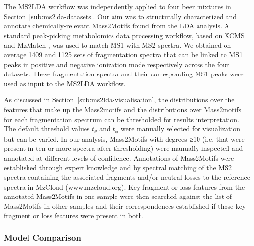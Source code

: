 The MS2LDA workflow was independently applied to four beer mixtures in Section~\ref{sub:ms2lda-datasets}. Our aim was to structurally characterized and annotate chemically-relevant Mass2Motifs found from the LDA analysis. A standard peak-picking metabolomics data processing workflow, based on XCMS \cite{Smith2006} and MzMatch \cite{Scheltema2011}, was used to match MS1 with MS2 spectra. We obtained on average 1409 and 1125 sets of fragmentation spectra that can be linked to MS1 peaks in positive and negative ionization mode respectively across the four datasets. These fragmentation spectra and their corresponding MS1 peaks were used as input to the MS2LDA workflow. 

As discussed in Section~\ref{sub:ms2lda-visualisation}, the distributions over the features that make up the Mass2motifs and the distributions over Mass2motifs for each fragmentation spectrum can be thresholded for results interpretation. The default threshold values $t_{\theta}$ and $t_{\phi}$ were manually selected for visualization but can be varied. In our analysis, Mass2Motifs with degrees ≥10 (i.e. that were present in ten or more spectra after thresholding) were manually inspected and annotated at different levels of confidence. Annotations of Mass2Motifs were established through expert knowledge and by spectral matching of the MS2 spectra containing the associated fragments and/or neutral losses to the reference spectra in MzCloud (www.mzcloud.org). Key fragment or loss features from the annotated Mass2Motifs in one sample were then searched against the list of Mass2Motifs in other samples and their correspondences established if those key fragment or loss features were present in both.

\subsubsection{Model Comparison}


